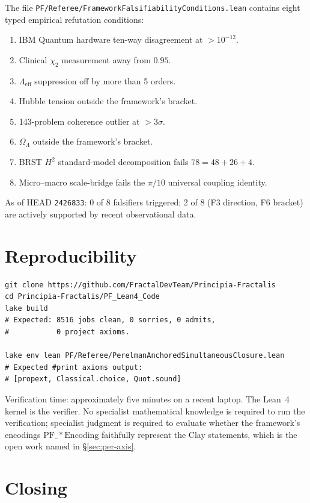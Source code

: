 \documentclass[11pt,a4paper]{article}
\theoremstyle{plain}
\theoremstyle{definition}
\theoremstyle{remark}
\newcommand{\code}[1]{\texttt{#1}}
\begin{document}
The file \code{PF/Referee/FrameworkFalsifiabilityConditions.lean}
contains eight typed empirical refutation conditions:

\begin{enumerate}[label=F\arabic*]
\item IBM Quantum hardware ten-way disagreement at $> 10^{-12}$.
\item Clinical $\chi_{2}$ measurement away from $0.95$.
\item $\Lambda_{\mathrm{eff}}$ suppression off by more than 5 orders.
\item Hubble tension outside the framework's bracket.
\item 143-problem coherence outlier at $> 3\sigma$.
\item $\Omega_{\Lambda}$ outside the framework's bracket.
\item BRST $H^{2}$ standard-model decomposition fails
$78 = 48 + 26 + 4$.
\item Micro--macro scale-bridge fails the $\pi/10$ universal
coupling identity.
\end{enumerate}

\noindent As of HEAD \code{2426833}: 0 of 8 falsifiers
triggered; 2 of 8 (F3 direction, F6 bracket) are actively
supported by recent observational data.

\section{Reproducibility}
\label{sec:reproducibility}

\begin{verbatim}
git clone https://github.com/FractalDevTeam/Principia-Fractalis
cd Principia-Fractalis/PF_Lean4_Code
lake build
# Expected: 8516 jobs clean, 0 sorries, 0 admits,
#           0 project axioms.

lake env lean PF/Referee/PerelmanAnchoredSimultaneousClosure.lean
# Expected #print axioms output:
# [propext, Classical.choice, Quot.sound]
\end{verbatim}

\noindent Verification time: approximately five minutes on a
recent laptop. The Lean~4 kernel is the verifier. No specialist
mathematical knowledge is required to run the verification;
specialist judgment is required to evaluate whether the
framework's encodings $\mathrm{PF\_*Encoding}$ faithfully
represent the Clay statements, which is the open work named in
\S\ref{sec:per-axis}.

\section{Closing}
\label{sec:closing}
\end{document}
